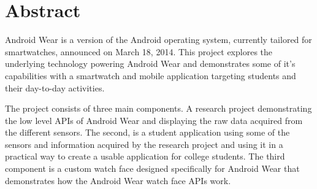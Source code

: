 \section*{Abstract}
Android Wear is a version of the Android operating system, currently tailored
for smartwatches, announced on March 18, 2014. This project explores the
underlying technology powering Android Wear and demonstrates some of it's
capabilities with a smartwatch and mobile application targeting students
and their day-to-day activities.

The project consists of three main components. A research project demonstrating
the low level APIs of Android Wear and displaying the raw data acquired from the
different sensors. The second, is a student application using some of the
sensors and information acquired by the research project and using it in a 
practical way to create a usable application for college students. The third
component is a custom watch face designed specifically for Android Wear that
demonstrates how the Android Wear watch face APIs work.
